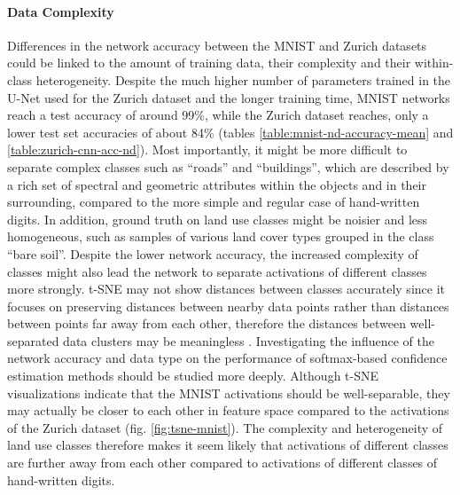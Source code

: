 \documentclass[10pt]{article}
\begin{document}
\paragraph{Data Complexity} Differences in the network accuracy between the \gls{MNIST} and Zurich datasets could be linked to the amount of training data, their complexity and their within-class heterogeneity. Despite the much higher number of parameters trained in the U-Net used for the Zurich dataset and the longer training time,  \gls{MNIST} networks reach a test accuracy of around 99\%, while the Zurich dataset reaches, only a lower test set accuracies of about 84\% (tables \ref{table:mnist-nd-accuracy-mean} and \ref{table:zurich-cnn-acc-nd}). Most importantly, it might be more difficult to separate complex classes such as ``roads'' and ``buildings'', which are described by a rich set of spectral and geometric attributes within the objects and in their surrounding, compared to the more simple and regular case of hand-written digits. In addition, ground truth on land use classes might be noisier and less homogeneous, such as samples of various land cover types grouped in the class ``bare soil''. Despite the lower network accuracy, the increased complexity of classes might also lead the network to separate activations of different classes more strongly. \gls{t-SNE} may not show distances between classes accurately since it focuses on preserving distances between nearby data points rather than distances between points far away from each other, therefore the distances between well-separated data clusters may be meaningless \cite{Maaten2008VisualizingDU, wattenberg2016how}. Investigating the influence of the network accuracy and data type on the performance of softmax-based confidence estimation methods should be studied more deeply. Although \gls{t-SNE} visualizations indicate that the \gls{MNIST} activations should be well-separable, they may actually be closer to each other in feature space compared to the activations of the Zurich dataset (fig. \ref{fig:tsne-mnist}).  The complexity and heterogeneity of land use classes therefore makes it seem likely that activations of different classes are further away from each other compared to activations of different classes of hand-written digits.

\end{document}
